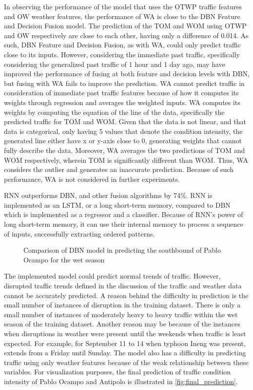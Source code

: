 In observing the performance of the model that uses the OTWP traffic features and OW weather features, the performance of WA is close to the DBN Feature and Decision Fusion model. The prediction of the TOM and WOM using OTWP and OW respectively are close to each other, having only a difference of 0.014. As such, DBN Feature and Decision Fusion, as with WA, could only predict traffic close to its inputs. However, considering the immediate past traffic, specifically considering the generalized past traffic of 1 hour and 1 day ago, may have improved the performance of fusing at both feature and decision levels with DBN, but fusing with WA fails to improve the prediction. WA cannot predict traffic in consideration of immediate past traffic features because of how it computes its weights through regression and averages the weighted inputs. WA computes its weights by computing the equation of the line of the data, specifically the predicted traffic for TOM and WOM. Given that the data is not linear, and that data is categorical, only having 5 values that denote the condition intensity, the generated line either have x or y-axis close to 0, generating weights that cannot fully describe the data. Moreover, WA averages the two predictions of TOM and WOM respectively, wherein TOM is significantly different than WOM. Thus, WA considers the outlier and generates an inaccurate prediction. Because of such performance, WA is not considered in further experiments. 

RNN outperforms DBN, and other fusion algorithms by 74\%. RNN is implemented as an LSTM, or a long short-term memory, compared to DBN which is implemented as a regressor and a classifier. Because of RNN’s power of long short-term memory, it can use their internal memory to process a sequence of inputs, successfully extracting ordered patterns. 

\begin{figure}[h]
  \centering
  \captionsetup{justification=centering}
  \caption{Comparison of DBN model in predicting the southbound of Pablo Ocampo for the wet season}
  \label{fig:dbn_comp_pocampo}
\end{figure}


The implemented model could predict normal trends of traffic. However, disrupted traffic trends defined in the discussion of the traffic and weather data cannot be accurately predicted. A reason behind the difficulty in prediction is the small number of instances of disruption in the training dataset. There is only a small number of instances of moderately heavy to heavy traffic within the wet season of the training dataset. Another reason may be because of the instances when disruptions in weather were present until the weekends when traffic is least expected. For example, for September 11 to 14 when typhoon Ineng was present, extends from a Friday until Sunday. The model also has a difficulty in predicting traffic using only weather features because of the weak relationship between these variables. For visualization purposes, the final prediction of traffic condition  intensity of Pablo Ocampo and Antipolo is illustrated in \ref{fig:final_prediction}.


